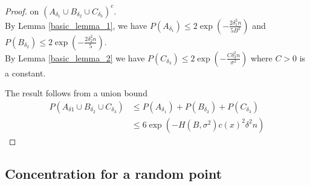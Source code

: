 \documentclass{article}
\begin{document}
\begin{proof}
on  $(A_{\delta_1}\cup B_{\delta_2}\cup C_{\delta_3})^c$.
\\
By Lemma \ref{basic_lemma_1}, we have $P(A_{\delta_1})\leq 2\exp(-\frac{2\delta_1^2n}{5B^2})$ and
$P(B_{\delta_2})\leq 2\exp(-\frac{2\delta_2^2n}{5})$.
\\
By Lemma \ref{basic_lemma_2} we have
$P(C_{\delta_3})\leq 2\exp(-\frac{C\delta_3^2n}{\sigma^2})$ where $C>0$ is a constant.

The result follows from a union bound 
\begin{equation*}
\begin{split}
    P(A_{\delta1}\cup B_{\delta_2}\cup C_{\delta_3})&\leq P(A_{\delta_1})+P(B_{\delta_2})+P(C_{\delta_3})\\
    &\leq 6\exp(-H(B,\sigma^2)c(x)^2\delta^2n)
\end{split}
\end{equation*}
\end{proof}

\subsection{Concentration for a random point}
\label{conc_random_pt}
\end{document}

